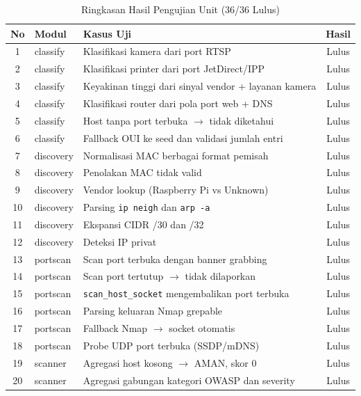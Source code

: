 \begin{table}[t]
    \centering
    \caption{Ringkasan Hasil Pengujian Unit (36/36 Lulus)}
    \label{tab:unit}
    \footnotesize
    \begin{tabular}{|c|l|l|c|}
        \hline
        \textbf{No} & \textbf{Modul} & \textbf{Kasus Uji} & \textbf{Hasil} \\
        \hline
        1 & classify & Klasifikasi kamera dari port RTSP & Lulus \\
        2 & classify & Klasifikasi printer dari port JetDirect/IPP & Lulus \\
        3 & classify & Keyakinan tinggi dari sinyal vendor + layanan kamera & Lulus \\
        4 & classify & Klasifikasi router dari pola port web + DNS & Lulus \\
        5 & classify & Host tanpa port terbuka $\rightarrow$ tidak diketahui & Lulus \\
        6 & classify & Fallback OUI ke seed dan validasi jumlah entri & Lulus \\
        7 & discovery & Normalisasi MAC berbagai format pemisah & Lulus \\
        8 & discovery & Penolakan MAC tidak valid & Lulus \\
        9 & discovery & Vendor lookup (Raspberry Pi vs Unknown) & Lulus \\
        10 & discovery & Parsing \texttt{ip neigh} dan \texttt{arp -a} & Lulus \\
        11 & discovery & Ekspansi CIDR /30 dan /32 & Lulus \\
        12 & discovery & Deteksi IP privat & Lulus \\
        13 & portscan & Scan port terbuka dengan banner grabbing & Lulus \\
        14 & portscan & Scan port tertutup $\rightarrow$ tidak dilaporkan & Lulus \\
        15 & portscan & \texttt{scan\_host\_socket} mengembalikan port terbuka & Lulus \\
        16 & portscan & Parsing keluaran Nmap grepable & Lulus \\
        17 & portscan & Fallback Nmap $\rightarrow$ socket otomatis & Lulus \\
        18 & portscan & Probe UDP port terbuka (SSDP/mDNS) & Lulus \\
        19 & scanner & Agregasi host kosong $\rightarrow$ AMAN, skor 0 & Lulus \\
        20 & scanner & Agregasi gabungan kategori OWASP dan severity & Lulus \\

\end{tabular}
\end{table}
